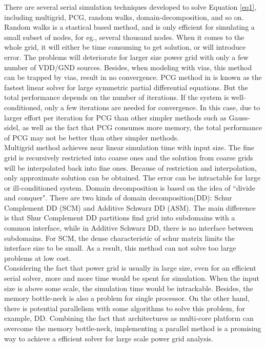 \documentclass{sig-alternate}
\begin{document}
	There are several serial simulation techniques developed to solve Equation \eqref{eq1}, including multigrid\cite{kozhaya}, 
	PCG\cite{Tsung-Hao}, random walks\cite{Boghrati}, domain-decomposition\cite{Quming,Zhongyu}, and so on. Random walks 
	is a stastical based method, and is only efficient for simulating a small subset of nodes, for eg., several thousand nodes.
	When it comes to the whole grid, it will either be time consuming to get solution, or will introduce error. The problems
	will deteriorate for larger size power grid with only a few number of VDD/GND sources. Besides, when modeling with vias, 
	this method can be trapped by vias, result in no convergence. PCG method in\cite{Tsung-Hao} is known as the fastest 
	linear solver 
	for large symmetric partial differential equations. But the total performance depends on the number of iterations. If the
	system is well-conditioned, only a few iterations are needed for convergence. In this case, due to larger effort per iteration
	for PCG than other simpler methods such as Gauss-sidel, as well as the fact that PCG consumes more memory, the total 
	performance of PCG may not be better than other simpler methods.\\	
	
	Multigrid method achieves near linear simulation time with input size. The fine grid is recursively restricted into coarse ones 
	and the solution from coarse grids will be interpolated back into fine ones. Because of restriction and interpolation, 
	only approximate solution can be obtained. The error can be intractable for large or ill-conditioned system. Domain 
	decomposition is based on the idea of ``divide and conquer". 
	There are two kinds of domain decomposition(DD): Schur Complement DD (SCM) and Additive Schwarz DD (ASM). The main difference 
	is that Shur 
	Complement DD partitions find grid into subdomains with a common interface, while in Additive Schwarz DD, there is no 
	interface between subdomains. For SCM, 
	the dense characteristic of schur matrix limits the interface size to be small. As a result, this method can not solve too 
	large problems at low cost.\\

	Considering the fact that power grid is usually in large size, even for an efficient serial solver, more and more time would be
	spent for simulation. When the input size is above some scale, the simulation time would be intrackable.
	Besides, the memory bottle-neck is also a problem for single processor. On the other hand, there is potential parallelism with
	some algorithms to solve this problem, for example, DD. Combining the fact that architectures as multi-core platform 
	can overcome the memory bottle-neck, implementing a parallel method is a promising way to achieve a efficient solver for 
	large scale power grid analysis.\\ 
\end{document}
